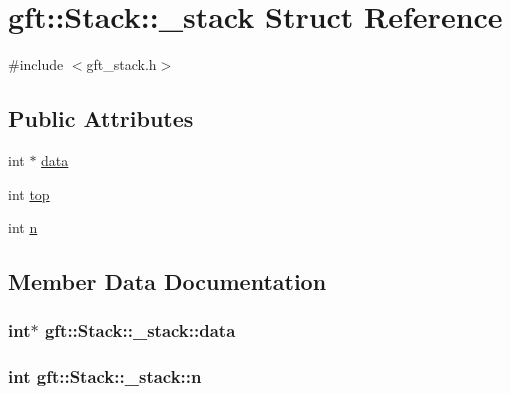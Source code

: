 \hypertarget{structgft_1_1Stack_1_1__stack}{}\section{gft\+:\+:Stack\+:\+:\+\_\+stack Struct Reference}
\label{structgft_1_1Stack_1_1__stack}


{\ttfamily \#include $<$gft\+\_\+stack.\+h$>$}

\subsection*{Public Attributes}
\begin{DoxyCompactItemize}
\item 
int $\ast$ \hyperlink{structgft_1_1Stack_1_1__stack_a93d186ca69875dc174c659e326610b50}{data}
\item 
int \hyperlink{structgft_1_1Stack_1_1__stack_a6f43582a8f8320933cdbe130127c21ae}{top}
\item 
int \hyperlink{structgft_1_1Stack_1_1__stack_afa89595ba64b8fb3c0b3e9aec3bc2639}{n}
\end{DoxyCompactItemize}


\subsection{Member Data Documentation}
\subsubsection[{\texorpdfstring{data}{data}}]{\setlength{\rightskip}{0pt plus 5cm}int$\ast$ gft\+::\+Stack\+::\+\_\+stack\+::data}\hypertarget{structgft_1_1Stack_1_1__stack_a93d186ca69875dc174c659e326610b50}{}\label{structgft_1_1Stack_1_1__stack_a93d186ca69875dc174c659e326610b50}
\subsubsection[{\texorpdfstring{n}{n}}]{\setlength{\rightskip}{0pt plus 5cm}int gft\+::\+Stack\+::\+\_\+stack\+::n}\hypertarget{structgft_1_1Stack_1_1__stack_afa89595ba64b8fb3c0b3e9aec3bc2639}{}\label{structgft_1_1Stack_1_1__stack_afa89595ba64b8fb3c0b3e9aec3bc2639}
